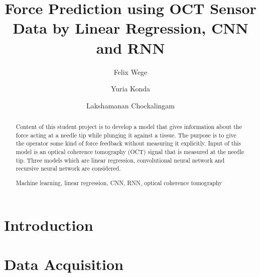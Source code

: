 \documentclass[runningheads,a4paper]{llncs}
\newcommand{\keywords}[1]{\par\addvspace\baselineskip
\noindent\keywordname\enspace\ignorespaces#1}
\begin{document}
\mainmatter  %

\title{Force Prediction using OCT Sensor Data 
by Linear Regression, CNN and RNN}

\author{Felix Wege \and Yuria Konda \and Lakshamanan Chockalingam}



\maketitle


\begin{abstract}
Content of this student project is to develop a model that gives 
information about the force acting at a needle tip while plunging it against 
a tissue.
The purpose is to give the operator some kind of force feedback
without measuring it explicitly.
Input of this model is an optical coherence tomography (OCT) signal
that is measured at the needle tip.
Three models which are linear regression, convolutional neural network
and recursive neural network are considered.

\keywords{Machine learning, linear regression, CNN, RNN, optical coherence tomography}
\end{abstract}

\section{Introduction}\label{sec:intro}


\section{Data Acquisition}\label{sec:dataAcqui}

\end{document}
